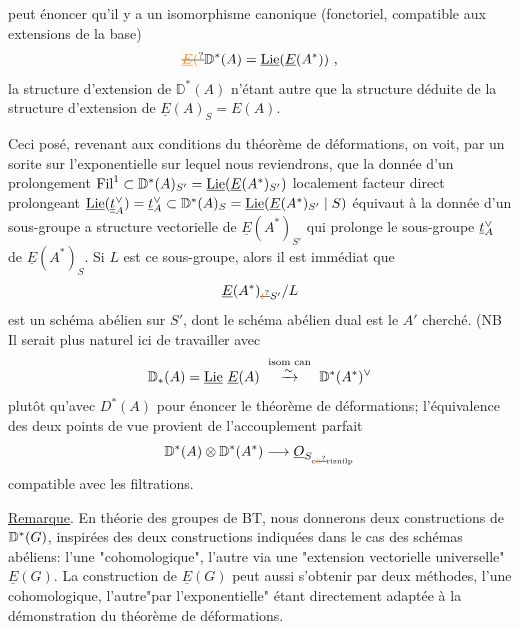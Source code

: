 peut énoncer qu'il y a un isomorphisme canonique (fonctoriel, compatible
aux extensions de la base)
\[
\deleted{\unsure{\underline E(}}\handwritten{\mathbb D}^{*}(A)=\underline{\mathrm{Lie}}(\underline E(A^{*}))\ ,
\]
la structure d'extension de $\mathbb D^{*}(A)$ n'étant autre que la structure
déduite de la structure d'extension de $\underline E(A)_S=E(A)$.

Ceci posé, revenant aux conditions du théorème de déformations, on
voit, par un sorite sur l'exponentielle sur lequel nous reviendrons, que
la donnée d'un prolongement $\mathrm{Fil}^{1}\subset\mathbb D^{*}(A)_{S'}=\underline{\mathrm{Lie}}(\underline E(A^{*})_{S'})$ localement facteur
direct prolongeant $\underline{\mathrm{Lie}}(\underline{\underline{t}}^{\vee}_A)=\underline t^{\vee}_A\subset\mathbb D^{*}(A)_S=\underline{\mathrm{Lie}}(\underline E(A^{*})_{S'}\mid S)$ équivaut à
la donnée d'un sous-groupe  a structure vectorielle de $\underline E(A^{*})_{S'}$ qui prolonge le sous-groupe $\underline t_A^{\vee}$ de $\underline E(A^{*})_S$. Si $L$ est ce sous-groupe, alors il est
immédiat que 
\[
\underline E(A^{*})_{\deleted{\unsure{t}}\handwritten{S'}}/L
\]
est un schéma abélien sur $S'$, dont le schéma abélien dual est le $A'$ cherché. (NB Il serait plus naturel ici de travailler avec 
\[
\mathbb D_{*}(A)=\underline{\mathrm{Lie}}\ \underline E(A)\ \overset{\text{isom can}}{\handwritten{\xrightarrow{\sim}}}\ \mathbb D^{*}(A^{*})^{\handwritten{\vee}}
\]
plutôt qu'avec $D^{*}(A)$ pour énoncer le théorème de déformations; l'équivalence des deux points de vue provient de l'accouplement parfait
\[
\mathbb D^{*}(A)\otimes\mathbb D^{*}(A^{*})\handwritten{\longrightarrow}\underline O_{S_{\mathrm{c}\deleted{\unsure{\mathrm{ii}}}\mathrm{risnilp}}}
\]
compatible avec les filtrations.\handwritten{)}

\uline{Remarque}. En théorie des groupes de BT, nous donnerons deux constructions de $\mathbb D^{*}(G)$, inspirées des deux constructions indiquées dans le cas des
schémas abéliens: l'une "cohomologique", l'autre via une "extension vectorielle universelle" $\underline E(G)$. La construction de $\underline E(G)$ peut aussi s'obtenir
par deux méthodes, l'une cohomologique, l'autre"par l'exponentielle" étant
directement adaptée à la démonstration du théorème de déformations.

